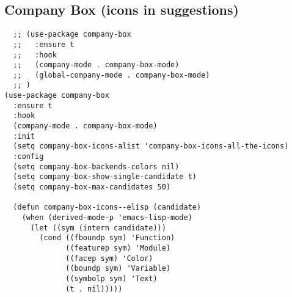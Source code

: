 \documentclass[11pt]{article}
\begin{document}
\subsection*{Company Box (icons in suggestions)}
\label{sec:org8a7406a}
\begin{verbatim}
  ;; (use-package company-box
  ;;   :ensure t
  ;;   :hook
  ;;   (company-mode . company-box-mode)
  ;;   (global-company-mode . company-box-mode)
  ;; )
(use-package company-box
  :ensure t
  :hook
  (company-mode . company-box-mode)
  :init
  (setq company-box-icons-alist 'company-box-icons-all-the-icons)
  :config
  (setq company-box-backends-colors nil)
  (setq company-box-show-single-candidate t)
  (setq company-box-max-candidates 50)

  (defun company-box-icons--elisp (candidate)
    (when (derived-mode-p 'emacs-lisp-mode)
      (let ((sym (intern candidate)))
        (cond ((fboundp sym) 'Function)
              ((featurep sym) 'Module)
              ((facep sym) 'Color)
              ((boundp sym) 'Variable)
              ((symbolp sym) 'Text)
              (t . nil)))))


\end{verbatim}
\end{document}
